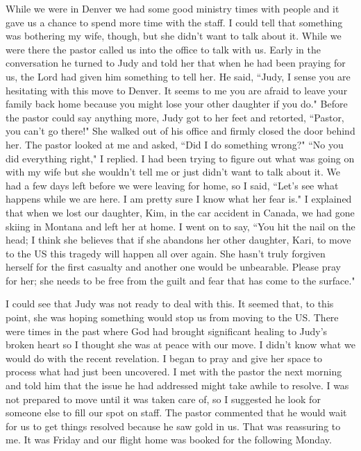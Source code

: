 \documentclass[oneside,12pt]{book}
\begin{document}
While we were in Denver we had some good ministry times with people and it gave us a chance to spend more time with the staff. I could tell that something was bothering my wife, though, but she didn't want to talk about it. While we were there the pastor called us into the office to talk with us. Early in the conversation he turned to Judy and told her that when he had been praying for us, the Lord had given him something to tell her. He said, ``Judy, I sense you are hesitating with this move to Denver. It seems to me you are afraid to leave your family back home because you might lose your other daughter if you do." Before the pastor could say anything more, Judy got to her feet and retorted, ``Pastor, you can't go there!" She walked out of his office and firmly closed the door behind her. The pastor looked at me and asked, ``Did I do something wrong?" ``No you did everything right," I replied. I had been trying to figure out what was going on with my wife but she wouldn't tell me or just didn't want to talk about it. We had a few days left before we were leaving for home, so I said, ``Let's see what happens while we are here. I am pretty sure I know what her fear is." I explained that when we lost our daughter, Kim, in the car accident in Canada, we had gone skiing in Montana and left her at home. I went on to say, ``You hit the nail on the head; I think she believes that if she abandons her other daughter, Kari, to move to the US this tragedy will happen all over again. She hasn't truly forgiven herself for the first casualty and another one would be unbearable. Please pray for her; she needs to be free from the guilt and fear that has come to the surface."

I could see that Judy was not ready to deal with this. It seemed that, to this point, she was hoping something would stop us from moving to the US. There were times in the past where God had brought significant healing to Judy's broken heart so I thought she was at peace with our move. I didn't know what we would do with the recent revelation. I began to pray and give her space to process what had just been uncovered. I met with the pastor the next morning and told him that the issue he had addressed might take awhile to resolve. I was not prepared to move until it was taken care of, so I suggested he look for someone else to fill our spot on staff. The pastor commented that he would wait for us to get things resolved because he saw gold in us. That was reassuring to me. It was Friday and our flight home was booked for the following Monday.
\end{document}
